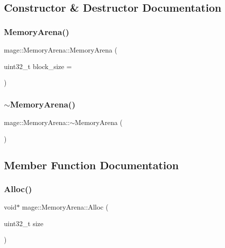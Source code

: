 \subsection{Constructor \& Destructor Documentation}
\hypertarget{classmage_1_1_memory_arena_aa243c458adb14e211f4dd944c4c82148}{}\label{classmage_1_1_memory_arena_aa243c458adb14e211f4dd944c4c82148} 
\subsubsection{\texorpdfstring{Memory\+Arena()}{MemoryArena()}}
{\footnotesize\ttfamily mage\+::\+Memory\+Arena\+::\+Memory\+Arena (\begin{DoxyParamCaption}\item[{uint32\+\_\+t}]{block\+\_\+size = {} }\end{DoxyParamCaption})}

\hypertarget{classmage_1_1_memory_arena_acfee6fc205e2eaf6aeef4acf19948e6e}{}\label{classmage_1_1_memory_arena_acfee6fc205e2eaf6aeef4acf19948e6e} 
\subsubsection{\texorpdfstring{$\sim$\+Memory\+Arena()}{~MemoryArena()}}
{\footnotesize\ttfamily mage\+::\+Memory\+Arena\+::$\sim$\+Memory\+Arena (\begin{DoxyParamCaption}{ }\end{DoxyParamCaption})}



\subsection{Member Function Documentation}
\hypertarget{classmage_1_1_memory_arena_a01e00ac6e109249bd80a1e9e79eb0b28}{}\label{classmage_1_1_memory_arena_a01e00ac6e109249bd80a1e9e79eb0b28} 
\subsubsection{\texorpdfstring{Alloc()}{Alloc()}\hspace{0.1cm}{\footnotesize\ttfamily [1/2]}}
{\footnotesize\ttfamily void$\ast$ mage\+::\+Memory\+Arena\+::\+Alloc (\begin{DoxyParamCaption}\item[{uint32\+\_\+t}]{size }\end{DoxyParamCaption})}

